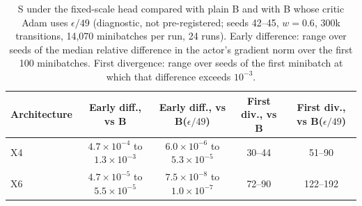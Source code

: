 \begin{table}[!htbp]
\caption{S under the fixed-scale head compared with plain B and with B whose critic Adam uses $\epsilon/49$ (diagnostic, not pre-registered; seeds 42--45, $w=0.6$, 300k transitions, 14,070 minibatches per run, 24 runs). Early difference: range over seeds of the median relative difference in the actor's gradient norm over the first 100 minibatches. First divergence: range over seeds of the first minibatch at which that difference exceeds $10^{-3}$.}
\label{tab:equiv}
\centering\footnotesize
\begin{tabular}{@{}lcccc@{}}
\toprule
Architecture & Early diff., vs B & Early diff., vs B($\epsilon/49$) & First div., vs B & First div., vs B($\epsilon/49$) \\
\midrule
X4 & $4.7\times10^{-4}$ to $1.3\times10^{-3}$ & $6.0\times10^{-6}$ to $5.3\times10^{-5}$ & 30--44 & 51--90 \\
X6 & $4.7\times10^{-5}$ to $5.5\times10^{-5}$ & $7.5\times10^{-8}$ to $1.0\times10^{-7}$ & 72--90 & 122--192 \\
\bottomrule
\end{tabular}
\end{table}
